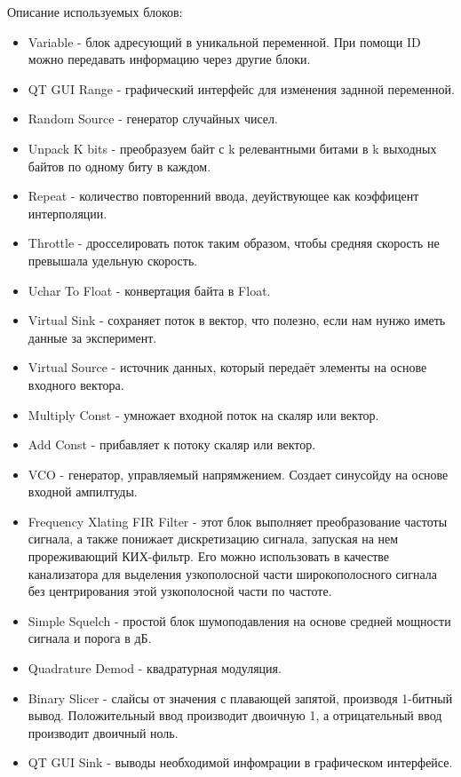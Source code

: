 Описание используемых блоков:
\begin{itemize}
	\item Variable - блок адресующий в уникальной переменной. При помощи ID можно передавать информацию через другие блоки.
	\item QT GUI Range - графический интерфейс для изменения заднной переменной.
	\item Random Source - генератор случайных чисел.
	\item Unpack K bits - преобразуем байт с k релевантными битами в k выходных байтов по одному биту в каждом.
	\item Repeat - количество повторенний ввода, деуйствующее как коэффицент интерполяции.
	\item Throttle - дросселировать поток таким образом, чтобы средняя скорость не превышала удельную скорость.
	\item Uchar To Float - конвертация байта в Float.
	\item Virtual Sink - сохраняет поток в вектор, что полезно, если нам нунжо иметь данные за эксперимент.
	\item Virtual Source - источник данных, который передаёт элементы на основе входного вектора.
	\item Multiply Const - умножает входной поток на скаляр или вектор.
	\item Add Const - прибавляет к потоку скаляр или вектор.
	\item VCO - генератор, управляемый напрямжением. Создает синусойду на основе входной ампилтуды.
	\item Frequency Xlating FIR Filter - этот блок выполняет преобразование частоты сигнала, а также понижает дискретизацию сигнала, запуская на нем прореживающий КИХ-фильтр. Его можно использовать в качестве канализатора для выделения узкополосной части широкополосного сигнала без центрирования этой узкополосной части по частоте. 
	\item Simple Squelch - простой блок шумоподавления на основе средней мощности сигнала и порога в дБ.
	\item Quadrature Demod - квадратурная модуляция.
	\item Binary Slicer - слайсы от значения с плавающей запятой, производя 1-битный вывод. Положительный ввод производит двоичную 1, а отрицательный ввод производит двоичный ноль. 
	\item QT GUI Sink - выводы необходимой инфомрации в графическом интерфейсе.
\end{itemize}

